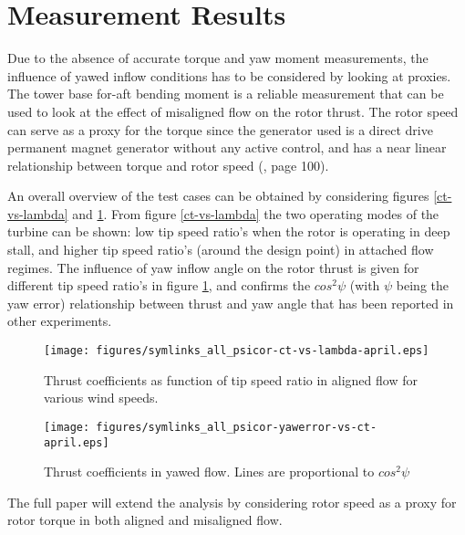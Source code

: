 \documentclass[a4paper]{jpconf}
\begin{document}
\section{Measurement Results}

Due to the absence of accurate torque and yaw moment measurements, the influence of yawed inflow conditions has to be considered by looking at proxies. The tower base for-aft bending moment is a reliable measurement that can be used to look at the effect of misaligned flow on the rotor thrust. The rotor speed can serve as a proxy for the torque since the generator used is a direct drive permanent magnet generator without any active control, and has a near linear relationship between torque and rotor speed (\cite{verelst_numerical_2013:diss}, page 100).

An overall overview of the test cases can be obtained by considering figures \ref{ct-vs-lambda} and \ref{ct-vs-yawerror}. From figure \ref{ct-vs-lambda} the two operating modes of the turbine can be shown: low tip speed ratio's when the rotor is operating in deep stall, and higher tip speed ratio's (around the design point) in attached flow regimes. The influence of yaw inflow angle on the rotor thrust is given for different tip speed ratio's in figure \ref{ct-vs-yawerror}, and confirms the $cos^2 \psi$ (with $\psi$ being the yaw error) relationship between thrust and yaw angle that has been reported in other experiments.

\begin{figure}[h]
\begin{minipage}{17pc}
\texttt{[image: figures/symlinks\_all\_psicor-ct-vs-lambda-april.eps]}
\caption{\label{ct-vs-lambda}Thrust coefficients as function of tip speed ratio in aligned flow for various wind speeds.}
\end{minipage}\hspace{2pc}%
\begin{minipage}{17pc}
\texttt{[image: figures/symlinks\_all\_psicor-yawerror-vs-ct-april.eps]}
\caption{\label{ct-vs-yawerror} Thrust coefficients in yawed flow. Lines are proportional to $cos^2 \psi$}
\end{minipage} 
\end{figure}

The full paper will extend the analysis by considering rotor speed as a proxy for rotor torque in both aligned and misaligned flow.

\end{document}
